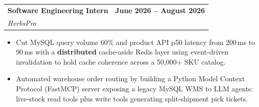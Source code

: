 \documentclass[letterpaper,10pt]{article}
\makeatletter
\newcommand{\resumeItem}[1]{
  \item\small{
    {#1 \vspace{-3pt}}
  }
}
\newcommand{\resumeSubheading}[4]{
  \vspace{-2pt}\item
    \begin{tabular*}{0.97\textwidth}[t]{l@{\extracolsep{\fill}}r}
      \textbf{#1} & \textbf{#2} \\   %
      \textit{\small#3} & \textit{\small #4} \\
    \end{tabular*}\vspace{-7pt}
}
\newcommand{\resumeItemListStart}{\begin{itemize}}
\newcommand{\resumeItemListEnd}{\end{itemize}\vspace{-7pt}}
\makeatother
\begin{document}
    \resumeSubheading
      {Software Engineering Intern}{June 2026 -- August 2026}
      {HerbsPro}{}
      \resumeItemListStart
        \resumeItem{Cut MySQL query volume 60\% and product API p50 latency from 200\,ms to 90\,ms with a \textbf{distributed} cache-aside Redis layer using event-driven invalidation to hold cache coherence across a 50,000+ SKU catalog.}
        \resumeItem{Automated warehouse order routing by building a Python Model Context Protocol (FastMCP) server exposing a legacy MySQL WMS to LLM agents: live-stock read tools plus write tools generating split-shipment pick tickets.}
      \resumeItemListEnd
\end{document}
